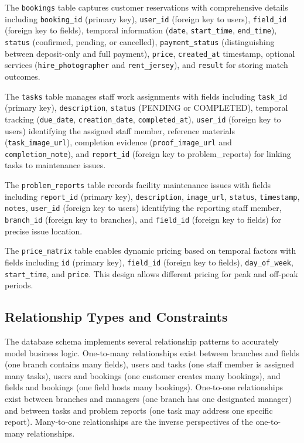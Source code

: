 The \texttt{bookings} table captures customer reservations with comprehensive details including \texttt{booking\_id} (primary key), \texttt{user\_id} (foreign key to users), \texttt{field\_id} (foreign key to fields), temporal information (\texttt{date}, \texttt{start\_time}, \texttt{end\_time}), \texttt{status} (confirmed, pending, or cancelled), \texttt{payment\_status} (distinguishing between deposit-only and full payment), \texttt{price}, \texttt{created\_at} timestamp, optional services (\texttt{hire\_photographer} and \texttt{rent\_jersey}), and \texttt{result} for storing match outcomes.

The \texttt{tasks} table manages staff work assignments with fields including \texttt{task\_id} (primary key), \texttt{description}, \texttt{status} (PENDING or COMPLETED), temporal tracking (\texttt{due\_date}, \texttt{creation\_date}, \texttt{completed\_at}), \texttt{user\_id} (foreign key to users) identifying the assigned staff member, reference materials (\texttt{task\_image\_url}), completion evidence (\texttt{proof\_image\_url} and \texttt{completion\_note}), and \texttt{report\_id} (foreign key to problem\_reports) for linking tasks to maintenance issues.

The \texttt{problem\_reports} table records facility maintenance issues with fields including \texttt{report\_id} (primary key), \texttt{description}, \texttt{image\_url}, \texttt{status}, \texttt{timestamp}, \texttt{notes}, \texttt{user\_id} (foreign key to users) identifying the reporting staff member, \texttt{branch\_id} (foreign key to branches), and \texttt{field\_id} (foreign key to fields) for precise issue location.

The \texttt{price\_matrix} table enables dynamic pricing based on temporal factors with fields including \texttt{id} (primary key), \texttt{field\_id} (foreign key to fields), \texttt{day\_of\_week}, \texttt{start\_time}, and \texttt{price}. This design allows different pricing for peak and off-peak periods.

\subsection{Relationship Types and Constraints}

The database schema implements several relationship patterns to accurately model business logic. One-to-many relationships exist between branches and fields (one branch contains many fields), users and tasks (one staff member is assigned many tasks), users and bookings (one customer creates many bookings), and fields and bookings (one field hosts many bookings). One-to-one relationships exist between branches and managers (one branch has one designated manager) and between tasks and problem reports (one task may address one specific report). Many-to-one relationships are the inverse perspectives of the one-to-many relationships.


